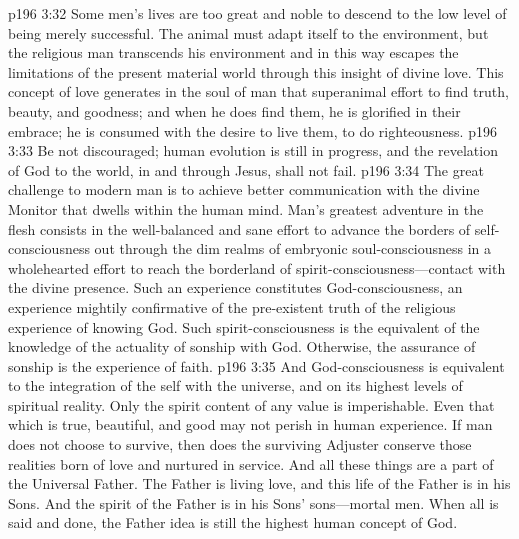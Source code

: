 \vs p196 3:32 Some men’s lives are too great and noble to descend to the low level of being merely successful. The animal must adapt itself to the environment, but the religious man transcends his environment and in this way escapes the limitations of the present material world through this insight of divine love. This concept of love generates in the soul of man that superanimal effort to find truth, beauty, and goodness; and when he does find them, he is glorified in their embrace; he is consumed with the desire to live them, to do righteousness.
\vs p196 3:33 Be not discouraged; human evolution is still in progress, and the revelation of God to the world, in and through Jesus, shall not fail.
\vs p196 3:34 The great challenge to modern man is to achieve better communication with the divine Monitor that dwells within the human mind. Man’s greatest adventure in the flesh consists in the well\hyp{}balanced and sane effort to advance the borders of self\hyp{}consciousness out through the dim realms of embryonic soul\hyp{}consciousness in a wholehearted effort to reach the borderland of spirit\hyp{}consciousness---contact with the divine presence. Such an experience constitutes God\hyp{}consciousness, an experience mightily confirmative of the pre\hyp{}existent truth of the religious experience of knowing God. Such spirit\hyp{}consciousness is the equivalent of the knowledge of the actuality of sonship with God. Otherwise, the assurance of sonship is the experience of faith.
\vs p196 3:35 And God\hyp{}consciousness is equivalent to the integration of the self with the universe, and on its highest levels of spiritual reality. Only the spirit content of any value is imperishable. Even that which is true, beautiful, and good may not perish in human experience. If man does not choose to survive, then does the surviving Adjuster conserve those realities born of love and nurtured in service. And all these things are a part of the Universal Father. The Father is living love, and this life of the Father is in his Sons. And the spirit of the Father is in his Sons’ sons---mortal men. When all is said and done, the Father idea is still the highest human concept of God.
\separatorline
